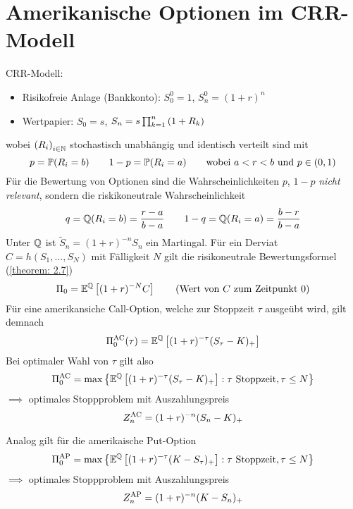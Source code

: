 \section{Amerikanische Optionen im CRR-Modell}

CRR-Modell:
\begin{itemize}
	\item Risikofreie Anlage (Bankkonto): $S_0^0 = 1$, $S_n^0 = (1+r)^n$
	\item Wertpapier:  $S_0 = s$, $S_n = s \prod_{k=1}^{n} \left( 1 + R_k \right)$
\end{itemize}
wobei $\left( R_i \right)_{i \in \mathbb{N}}$ stochastisch unabhängig und identisch verteilt sind mit
\begin{equation*}
	p = \mathbb{P}(R_i = b) \qquad 1-p = \mathbb{P}(R_i = a) \qquad \text{wobei } a < r < b \text{ und } p \in (0,1)
\end{equation*}
Für die Bewertung von Optionen sind die Wahrscheinlichkeiten $p$, $1-p$ \textit{nicht relevant}, sondern die riskikoneutrale Wahrscheinlichkeit 
\begin{equation*}
	q = \mathbb{Q}(R_i = b) = \frac{r-a}{b-a} \qquad 1-q = \mathbb{Q}(R_i = a) = \frac{b-r}{b-a}
\end{equation*}
Unter $\mathbb{Q}$ ist $\tilde{S}_n = (1+r)^{-n} S_n$ ein Martingal.
Für ein Derviat $C = h(S_1, \dots, S_N)$ mit Fälligkeit $N$ gilt die risikoneutrale Bewertungsformel (\cref{theorem: 2.7})
\begin{equation*}
	\Pi_0 = \mathbb{E}^{\mathbb{Q}}\left[ (1+r)^{-N} C \right]
	\tag{Wert von $C$ zum Zeitpunkt $0$}
\end{equation*}
Für eine amerikansiche Call-Option, welche zur Stoppzeit $\tau$ ausgeübt wird, gilt demnach
\begin{equation*}
	\Pi_0^{\operatorname{AC}}(\tau) = \mathbb{E}^{\mathbb{Q}} \left[ (1+r)^{-\tau} (S_\tau - K)_+ \right]
\end{equation*}
Bei optimaler Wahl von $\tau$ gilt also
\begin{equation*}
	\Pi_0^{\operatorname{AC}} = \max\left\{ \mathbb{E}^{\mathbb{Q}}\left[ (1+r)^{-\tau} (S_\tau - K)_+ \right] : \tau \text{ Stoppzeit}, \tau \le N \right\}
\end{equation*}
$\implies$ optimales Stoppproblem mit Auszahlungspreis
\begin{equation*}
	Z_n^{\operatorname{AC}} = (1+r)^{-n} (S_n - K)_+
\end{equation*}

Analog gilt für die amerikaische Put-Option
\begin{equation*}
	\Pi_0^{\operatorname{AP}} = \max\left\{ \mathbb{E}^{\mathbb{Q}}\left[ (1+r)^{-\tau} (K - S_\tau)_+ \right] : \tau \text{ Stoppzeit}, \tau \le N \right\}
\end{equation*}
$\implies$ optimales Stoppproblem mit Auszahlungspreis
\begin{equation*}
Z_n^{\operatorname{AP}} = (1+r)^{-n} (K - S_n)_+
\end{equation*}

